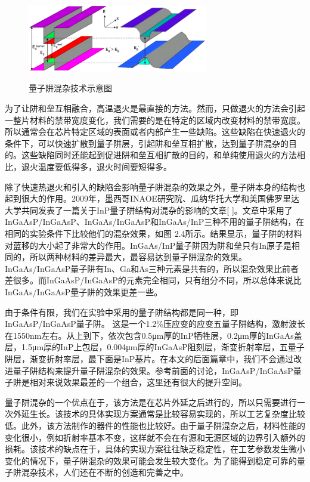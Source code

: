 \documentclass{ZJUthesis}
\begin{document}
\begin{figure}[!ht]
  \centering
  \includegraphics[width=0.7\textwidth]{./Pictures/qwi.eps}\\
  \caption{量子阱混杂技术示意图}
  \label{fig_qwi}
\end{figure}

为了让阱和垒互相融合，高温退火是最直接的方法。然而，只做退火的方法会引起一整片材料的禁带宽度变化，我们需要的是在特定的区域内改变材料的禁带宽度。所以通常会在芯片特定区域的表面或者内部产生一些缺陷。这些缺陷在快速退火的条件下，可以快速扩散到量子阱层，引起阱和垒互相扩散，达到量子阱混杂的目的。这些缺陷同时还能起到促进阱和垒互相扩散的目的，和单纯使用退火的方法相比，退火温度要低得多，退火时间要短得多。

除了快速热退火和引入的缺陷会影响量子阱混杂的效果之外，量子阱本身的结构也起到很大的作用。2009年，墨西哥INAOE研究院、瓜纳华托大学和美国佛罗里达大学共同发表了一篇关于InP量子阱结构对混杂的影响的文章[ ]。文章中采用了InGaAsP/InGaAsP、InGaAs/InGaAsP和InGaAs/InP三种不用的量子阱结构，在相同的实验条件下比较他们的混杂效果，如图 2.4所示。结果显示，量子阱的材料对蓝移的大小起了非常大的作用。InGaAs/InP量子阱因为阱和垒只有In原子是相同的，所以两种材料的差异最大，最容易达到量子阱混杂的效果。InGaAs/InGaAsP量子阱有In、Ga和As三种元素是共有的，所以混杂效果比前者差很多。而InGaAsP/InGaAsP的元素完全相同，只有组分不同，所以总体来说比InGaAs/InGaAsP量子阱的效果更差一些。



由于条件有限，我们在实验中采用的量子阱结构都是同一种，即InGaAsP/InGaAsP量子阱。 这是一个1.2\%压应变的应变五量子阱结构，激射波长在1550nm左右。从上到下，依次包含0.5μm厚的InP牺牲层，0.2μm厚的InGaAs盖层，1.5μm厚的InP上包层，0.004μm厚的InGaAsP阻刻层，渐变折射率层，五量子阱层，渐变折射率层，最下面是InP基片。在本文的后面篇章中，我们不会通过改进量子阱结构来提升量子阱混杂的效果。参考前面的讨论，InGaAsP/InGaAsP量子阱是相对来说效果最差的一个组合，这里还有很大的提升空间。

量子阱混杂的一个优点在于，该方法是在芯片外延之后进行的，所以只需要进行一次外延生长。该技术的具体实现方案通常是比较容易实现的，所以工艺复杂度比较低。此外，该方法制作的器件的性能也比较好。由于量子阱混杂之后，材料性能的变化很小，例如折射率基本不变，这样就不会在有源和无源区域的边界引入额外的损耗。该技术的缺点在于，具体的实现方案往往缺乏稳定性，在工艺参数发生微小变化的情况下，量子阱混杂的效果可能会发生较大变化。为了能得到稳定可靠的量子阱混杂技术，人们还在不断的创造和完善之中。
\end{document}
